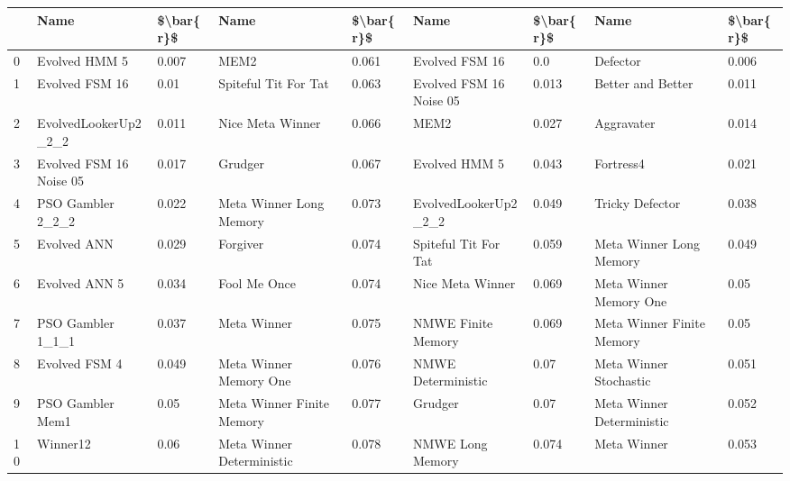 \begin{tabular}{lllllllll}
\toprule
{} &                     Name & \$\textbackslash bar\{r\}\$ &                       Name & \$\textbackslash bar\{r\}\$ &                       Name & \$\textbackslash bar\{r\}\$ &                       Name & \$\textbackslash bar\{r\}\$ \\
\midrule
0  &            Evolved HMM 5 &     0.007 &                       MEM2 &     0.061 &             Evolved FSM 16 &       0.0 &                   Defector &     0.006 \\
1  &           Evolved FSM 16 &      0.01 &       Spiteful Tit For Tat &     0.063 &    Evolved FSM 16 Noise 05 &     0.013 &          Better and Better &     0.011 \\
2  &     EvolvedLookerUp2\_2\_2 &     0.011 &           Nice Meta Winner &     0.066 &                       MEM2 &     0.027 &                 Aggravater &     0.014 \\
3  &  Evolved FSM 16 Noise 05 &     0.017 &                    Grudger &     0.067 &              Evolved HMM 5 &     0.043 &                  Fortress4 &     0.021 \\
4  &        PSO Gambler 2\_2\_2 &     0.022 &    Meta Winner Long Memory &     0.073 &       EvolvedLookerUp2\_2\_2 &     0.049 &            Tricky Defector &     0.038 \\
5  &              Evolved ANN &     0.029 &                   Forgiver &     0.074 &       Spiteful Tit For Tat &     0.059 &    Meta Winner Long Memory &     0.049 \\
6  &            Evolved ANN 5 &     0.034 &               Fool Me Once &     0.074 &           Nice Meta Winner &     0.069 &     Meta Winner Memory One &      0.05 \\
7  &        PSO Gambler 1\_1\_1 &     0.037 &                Meta Winner &     0.075 &         NMWE Finite Memory &     0.069 &  Meta Winner Finite Memory &      0.05 \\
8  &            Evolved FSM 4 &     0.049 &     Meta Winner Memory One &     0.076 &         NMWE Deterministic &      0.07 &     Meta Winner Stochastic &     0.051 \\
9  &         PSO Gambler Mem1 &      0.05 &  Meta Winner Finite Memory &     0.077 &                    Grudger &      0.07 &  Meta Winner Deterministic &     0.052 \\
10 &                 Winner12 &      0.06 &  Meta Winner Deterministic &     0.078 &           NMWE Long Memory &     0.074 &                Meta Winner &     0.053 \\

\end{tabular}
